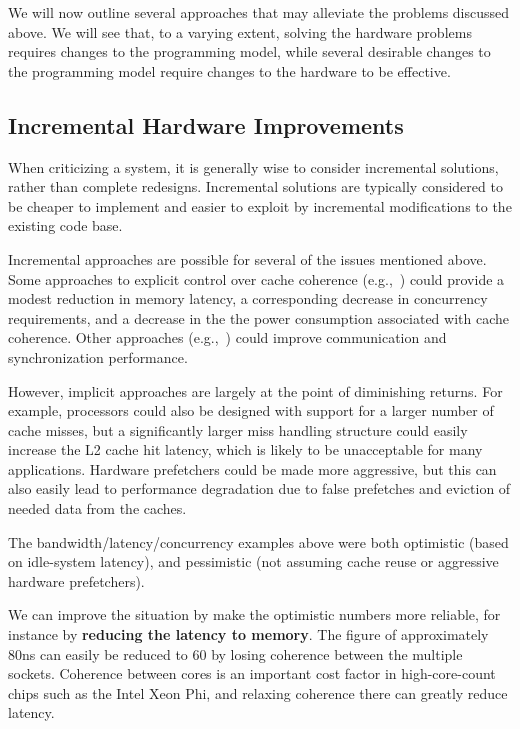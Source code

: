 We will now outline several approaches that may alleviate the problems 
discussed above.  We will see that, to a varying extent, solving
the hardware problems requires changes to the programming model, while
several desirable changes to the programming model require changes to
the hardware to be effective.

\subsection{Incremental Hardware Improvements}

When criticizing a system, it is generally wise to consider incremental solutions, 
rather than complete redesigns.  Incremental solutions are typically considered
to be cheaper to implement and easier to exploit by incremental modifications
to the existing code base.   

Incremental approaches are possible for several of the issues
mentioned above.  Some approaches to explicit control over cache
coherence (e.g.,~\cite{dally2012ExplicitManagement}) could provide a
modest reduction in memory latency, a corresponding decrease in
concurrency requirements, and a decrease in the the power consumption
associated with cache coherence.  Other approaches
(e.g.,~\cite{mccalpin2012push,CommSyncMulticore_2008})
could improve communication and synchronization performance.

However, implicit approaches are largely at the point of diminishing
returns.  For example, processors could also be designed with support
for a larger number of cache misses, but a significantly larger miss
handling structure could easily increase the L2 cache hit latency,
which is likely to be unacceptable for many applications.  Hardware
prefetchers could be made more aggressive, but this can also easily
lead to performance degradation due to false prefetches and eviction
of needed data from the caches.

The bandwidth/latency/concurrency examples above were both optimistic (based 
on idle-system latency), and pessimistic (not assuming cache reuse or aggressive 
hardware prefetchers).

We can improve the situation by make the optimistic numbers more
reliable, for instance by \textbf{reducing the latency to memory}. The
figure of approximately 80ns can easily be reduced to 60 by losing
coherence between the multiple sockets.  Coherence between cores is an
important cost factor in high-core-count chips such as the Intel Xeon
Phi, and relaxing coherence there can greatly reduce latency.

